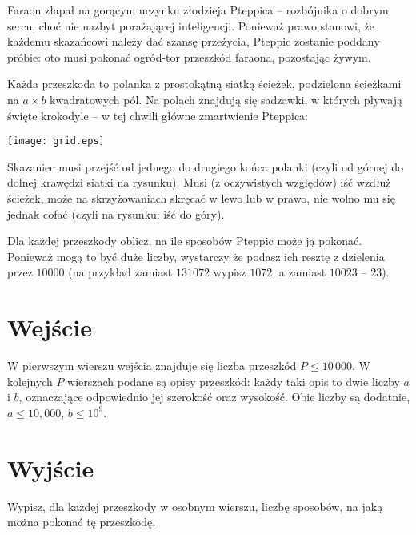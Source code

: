 \documentclass{spiral-kurs}
\begin{document}
\makeheader
%
  Faraon złapał na gorącym uczynku złodzieja Pteppica -- rozbójnika o dobrym sercu, choć nie nazbyt porażającej inteligencji.
  Ponieważ prawo stanowi, że każdemu skazańcowi należy dać szansę przeżycia, Pteppic zostanie poddany próbie:
  oto musi pokonać ogród-tor przeszkód faraona, pozostając żywym.

  Każda przeszkoda to polanka z prostokątną siatką ścieżek, podzielona ścieżkami na $a \times b$ kwadratowych pól.
  Na polach znajdują się sadzawki, w których pływają święte krokodyle -- w tej chwili główne zmartwienie Pteppica:

  \begin{center}
   \texttt{[image: grid.eps]}
  \end{center}

  Skazaniec musi przejść od jednego do drugiego końca polanki (czyli od górnej do dolnej krawędzi siatki na rysunku).
  Musi (z oczywistych względów) iść wzdłuż ścieżek, może na skrzyżowaniach skręcać w lewo lub w prawo, nie wolno mu się jednak cofać (czyli na rysunku: iść do góry).

  Dla każdej przeszkody oblicz, na ile sposobów Pteppic może ją pokonać. Ponieważ mogą to być duże liczby, wystarczy że podasz ich resztę z dzielenia przez $10000$
  (na przykład zamiast $131072$ wypisz $1072$, a zamiast $10023$ -- $23$).

  \section{Wejście}
  W pierwszym wierszu wejścia znajduje się liczba przeszkód $P \leq 10\,000$. W kolejnych $P$ wierszach podane są opisy przeszkód:
  każdy taki opis to dwie liczby $a$ i $b$, oznaczające odpowiednio jej szerokość oraz wysokość. Obie liczby są dodatnie, $a \leq 10,000$, $b \leq 10^9$.

  \section{Wyjście}
  Wypisz, dla każdej przeszkody w osobnym wierszu, liczbę sposobów, na jaką można pokonać tę przeszkodę.



  
\end{document}
